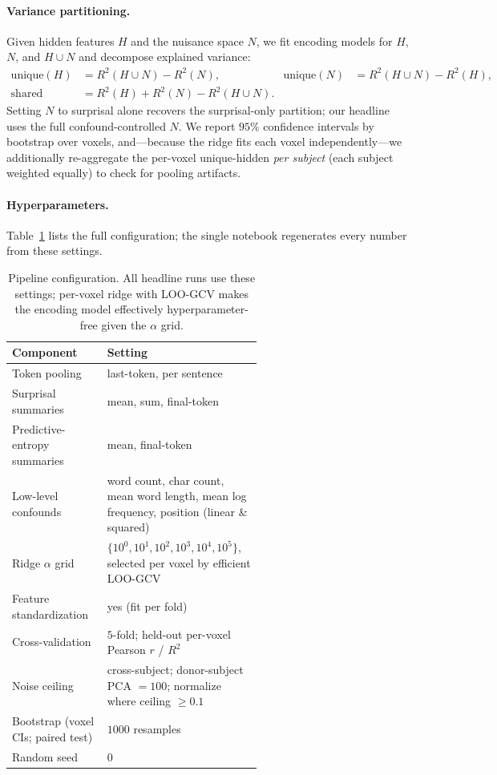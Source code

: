 \documentclass{article}
\begin{document}
\paragraph{Variance partitioning.} Given hidden features $H$ and the nuisance space $N$, we fit
encoding models for $H$, $N$, and $H \cup N$ and decompose explained variance:
\begin{align}
\text{unique}(H) &= R^2(H \cup N) - R^2(N), &
\text{unique}(N) &= R^2(H \cup N) - R^2(H), \\
\text{shared} &= R^2(H) + R^2(N) - R^2(H \cup N). & &
\end{align}
Setting $N$ to surprisal alone recovers the surprisal-only partition; our headline uses the
full confound-controlled $N$. We report $95\%$ confidence intervals by bootstrap over voxels,
and---because the ridge fits each voxel independently---we additionally re-aggregate the
per-voxel unique-hidden \emph{per subject} (each subject weighted equally) to check for
pooling artifacts.

\paragraph{Hyperparameters.} Table~\ref{tab:hyper} lists the full configuration; the single
notebook regenerates every number from these settings.

\begin{table}[t]
\caption{Pipeline configuration. All headline runs use these settings; per-voxel ridge with
LOO-GCV makes the encoding model effectively hyperparameter-free given the $\alpha$ grid.}
\label{tab:hyper}
\centering
\begin{tabular}{l p{0.62\linewidth}}
\toprule
Component & Setting \\
\midrule
Token pooling & last-token, per sentence \\
Surprisal summaries & mean, sum, final-token \\
Predictive-entropy summaries & mean, final-token \\
Low-level confounds & word count, char count, mean word length, mean log frequency, position (linear \& squared) \\
Ridge $\alpha$ grid & $\{10^0,10^1,10^2,10^3,10^4,10^5\}$, selected per voxel by efficient LOO-GCV \\
Feature standardization & yes (fit per fold) \\
Cross-validation & $5$-fold; held-out per-voxel Pearson $r$ / $R^2$ \\
Noise ceiling & cross-subject; donor-subject PCA $=100$; normalize where ceiling $\ge 0.1$ \\
Bootstrap (voxel CIs; paired test) & $1000$ resamples \\
Random seed & $0$ \\
\bottomrule
\end{tabular}
\end{table}
\end{document}

